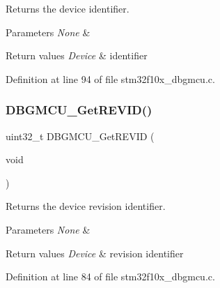 Returns the device identifier. 


\begin{DoxyParams}{Parameters}
{\em None} & \\
\hline
\end{DoxyParams}

\begin{DoxyRetVals}{Return values}
{\em Device} & identifier \\
\hline
\end{DoxyRetVals}


Definition at line 94 of file stm32f10x\+\_\+dbgmcu.\+c.

\mbox{\label{group___d_b_g_m_c_u___exported___functions_ga47419e9ca75ab7be4c70feb82faa0511}} 
\subsubsection{\texorpdfstring{D\+B\+G\+M\+C\+U\+\_\+\+Get\+R\+E\+V\+I\+D()}{DBGMCU\_GetREVID()}}
{\footnotesize\ttfamily uint32\+\_\+t D\+B\+G\+M\+C\+U\+\_\+\+Get\+R\+E\+V\+ID (\begin{DoxyParamCaption}\item[{void}]{ }\end{DoxyParamCaption})}



Returns the device revision identifier. 


\begin{DoxyParams}{Parameters}
{\em None} & \\
\hline
\end{DoxyParams}

\begin{DoxyRetVals}{Return values}
{\em Device} & revision identifier \\
\hline
\end{DoxyRetVals}


Definition at line 84 of file stm32f10x\+\_\+dbgmcu.\+c.

